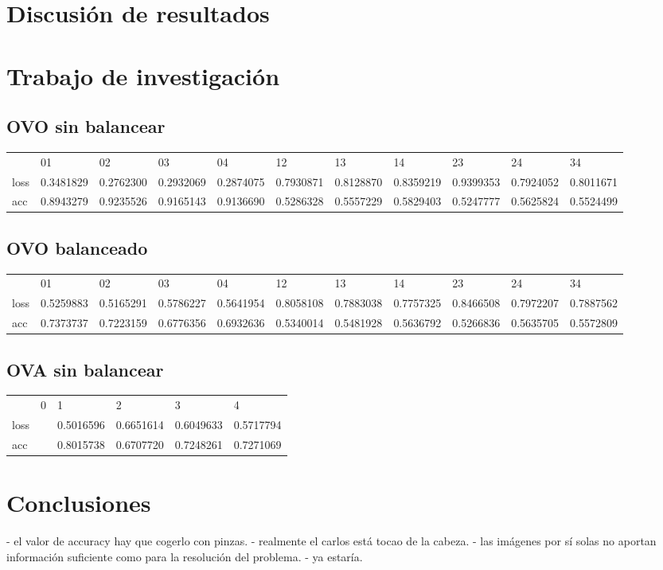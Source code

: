 \documentclass[]{article}
\begin{document}
\section{Discusión de resultados}

\section{Trabajo de investigación}

	\subsection{OVO sin balancear}
	
	\begin{table}[h]
		\begin{tabular}{lllllllllll}
			& 01 & 02 & 03 & 04 & 12 & 13 & 14 & 23 & 24 & 34 \\
			loss & 0.3481829 & 0.2762300 & 0.2932069 & 0.2874075 & 0.7930871 & 0.8128870 & 0.8359219 & 0.9399353 & 0.7924052 & 0.8011671 \\
			acc & 0.8943279 & 0.9235526 & 0.9165143 & 0.9136690 & 0.5286328 & 0.5557229 & 0.5829403 & 0.5247777 & 0.5625824 & 0.5524499
		\end{tabular}
	\end{table}
	
	\subsection{OVO balanceado}
	
	\begin{table}[h]
		\begin{tabular}{lllllllllll}
			& 01 & 02 & 03 & 04 & 12 & 13 & 14 & 23 & 24 & 34 \\
			loss & 0.5259883 & 0.5165291 & 0.5786227 & 0.5641954 & 0.8058108 & 0.7883038 & 0.7757325 & 0.8466508 & 0.7972207 & 0.7887562 \\
			acc & 0.7373737 & 0.7223159 & 0.6776356 & 0.6932636 & 0.5340014 & 0.5481928 & 0.5636792 & 0.5266836 & 0.5635705 & 0.5572809
		\end{tabular}
	\end{table}

	\subsection{OVA sin balancear}
	
	\begin{table}[h]
		\begin{tabular}{llllll}
			& 0 & 1 & 2 & 3 & 4 \\
			loss & & 0.5016596 & 0.6651614 & 0.6049633 & 0.5717794 \\
			acc & & 0.8015738 & 0.6707720 & 0.7248261 & 0.7271069
		\end{tabular}
	\end{table}
				

\section{Conclusiones}

	- el valor de accuracy hay que cogerlo con pinzas.
	- realmente el carlos está tocao de la cabeza.
	- las imágenes por sí solas no aportan información suficiente como para la resolución del problema.
	- ya estaría.



\end{document}
